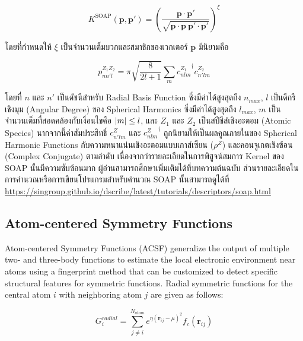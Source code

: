\begin{equation}
    K^\mathrm{SOAP}(\mathbf{p}, \mathbf{p'}) = \left( \frac{\mathbf{p} \cdot \mathbf{p'}}{\sqrt{\mathbf{p} 
    \cdot \mathbf{p}~\mathbf{p'} \cdot \mathbf{p'}}}\right)^{\xi}
\end{equation}

\noindent โดยที่กำหนดให้ $\xi$ เป็นจำนวนเต็มบวกและสมาชิกของเวกเตอร์ $\mathbf{p}$ มีนิยามคือ 

\begin{equation}
    p^{Z_1 Z_2}_{n n' l} = \pi \sqrt{\frac{8}{2l+1}}\sum_m {c^{Z_1}_{n l m}}^{\dagger} c^{Z_2}_{n' l m}
\end{equation}

\noindent โดยที่ $n$ และ $n'$ เป็นดัชนีสำหรับ Radial Basis Function ซึ่งมีค่าได้สูงสุดถึง $n_{max}$, $l$ เป็นดีกรีเชิงมุม (Angular Degree)
ของ Spherical Harmonics ซึ่งมีค่าได้สูงสุดถึง $l_{max}$, $m$ เป็นจำนวนเต็มที่สอดคล้องกับเงื่อนไขคือ $\abs{m} \leq l$, 
และ $Z_{1}$ และ $Z_{2}$ เป็นสปีชีส์เชิงอะตอม (Atomic Species) นากจากนี้ค่าสัมประสิทธิ์ $c^{Z}_{n'lm}$ และ ${c^{Z}_{nlm}}^{\dagger}$ 
ถูกนิยามให้เป็นผลคูณภายในของ Spherical Harmonic Functions กับความหนาแน่นเชิงอะตอมแบบเกาส์เซียน ($\rho^Z$) และคอนจูเกตเชิงซ้อน 
(Complex Conjugate) ตามลำดับ\cite{de2016} เนื่องจากว่ารายละเอียดในการพิสูจน์สมการ Kernel ของ SOAP นั้นมีความซับซ้อนมาก
ผู้อ่านสามารถศึกษาเพิ่มเติมได้ที่บทความต้นฉบับ ส่วนรายละเอียดในการคำนวณหรือการเขียนโปรแกรมสำหรับคำนวณ SOAP นั้นสามารถดูได้ที่
\url{https://singroup.github.io/dscribe/latest/tutorials/descriptors/soap.html}

\subsection{Atom-centered Symmetry Functions}

Atom-centered Symmetry Functions (ACSF) generalize the output of multiple two- and three-body functions 
to estimate the local electronic environment near atoms using a fingerprint method that can be customized 
to detect specific structural features for symmetric functions.\cite{behler2011} Radial symmetric functions 
for the central atom $i$ with neighboring atom $j$ are given as follows:

\begin{equation}
    G^{radial}_{i} = \sum^{N_{atom}}_{j \neq i} e^{\eta (\boldsymbol{r}_{ij} - \mu)^{2}} f_{c}(\boldsymbol{r}_{ij})
\end{equation}

